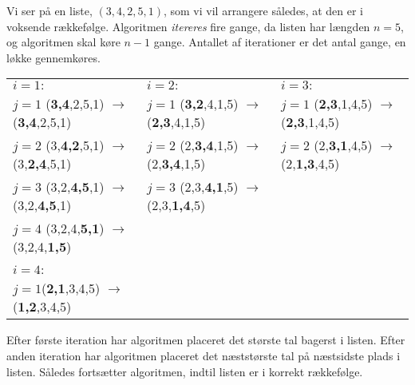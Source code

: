 \begin{exmp}
Vi ser på en liste, $(3,4,2,5,1)$, som vi vil arrangere således, at den er i voksende rækkefølge. Algoritmen \emph{itereres} fire gange, da listen har længden $n=5$, og algoritmen skal køre $n-1$ gange. Antallet af iterationer er det antal gange, en løkke gennemkøres.

\begin{flushleft}
\begin{tabular}{l l l}
$i=1:$ & $i=2:$ & $i=3:$ \\ 
$j=1$ (\textbf{3,4},2,5,1) $\rightarrow$ (\textbf{3,4},2,5,1) & $j=1$ (\textbf{3,2},4,1,5) $\rightarrow$ (\textbf{2,3},4,1,5) & $j=1$ (\textbf{2,3},1,4,5) $\rightarrow$ (\textbf{2,3},1,4,5) \\  
$j=2$ (3,\textbf{4,2},5,1) $\rightarrow$ (3,\textbf{2,4},5,1)  & $j=2$ (2,\textbf{3,4},1,5) $\rightarrow$ (2,\textbf{3,4},1,5) & $j=2$ (2,\textbf{3,1},4,5) $\rightarrow$ (2,\textbf{1,3},4,5) \\
$j=3$ (3,2,\textbf{4,5},1) $\rightarrow$ (3,2,\textbf{4,5},1) & $j=3$ (2,3,\textbf{4,1},5) $\rightarrow$ (2,3,\textbf{1,4},5) & \\
$j=4$ (3,2,4,\textbf{5,1}) $\rightarrow$ (3,2,4,\textbf{1,5}) & & \\
& &  \\
$i=4:$ & & \\
$j=1$(\textbf{2,1},3,4,5) $\rightarrow$ (\textbf{1,2},3,4,5) & &
\end{tabular}
\end{flushleft}



Efter første iteration  har algoritmen placeret det største tal bagerst i listen. Efter anden iteration har algoritmen placeret det næststørste tal på næstsidste plads i listen. Således fortsætter algoritmen, indtil listen er i korrekt rækkefølge.

\end{exmp}
